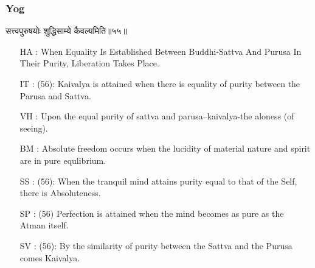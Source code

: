 \begin{frame}[fragile]\frametitle{Yog}
\begin{sanskrit}
सत्त्वपुरुषयोः शुद्धिसाम्ये कैवल्यमिति॥५५॥
\end{sanskrit}

	\begin{itemize}
	\item [HA]: When Equality Is Established Between Buddhi-Sattva And Purusa In Their Purity, Liberation Takes Place.
	\item [IT]: (56): Kaivalya is attained when there is equality of purity between the Parusa and Sattva.
	\item [VH]: Upon the equal purity of sattva and parusa–kaivalya-the aloness (of seeing).
	\item [BM]: Absolute freedom occurs when the lucidity of material nature and spirit are in pure equlibrium.
	\item [SS]: (56): When the tranquil mind attains purity equal to that of the Self, there is Absoluteness.
	\item [SP]: (56) Perfection is attained when the mind becomes as pure as the Atman itself.
	\item [SV]: (56): By the similarity of purity between the Sattva and the Purusa comes Kaivalya. 
	\end{itemize}
\end{frame}

